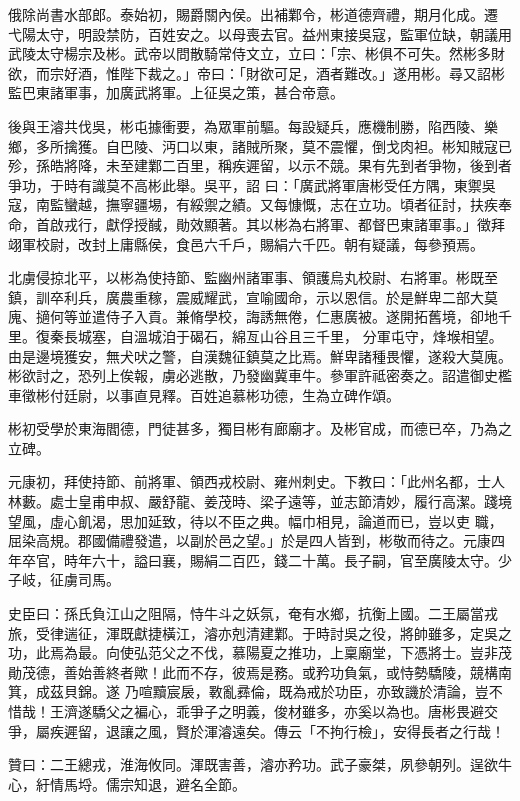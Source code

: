 \begin{pinyinscope}
 俄除尚書水部郎。泰始初，賜爵關內侯。出補鄴令，彬道德齊禮，期月化成。遷
 弋陽太守，明設禁防，百姓安之。以母喪去官。益州東接吳寇，監軍位缺，朝議用武陵太守楊宗及彬。武帝以問散騎常侍文立，立曰：「宗、彬俱不可失。然彬多財欲，而宗好酒，惟陛下裁之。」帝曰：「財欲可足，酒者難改。」遂用彬。尋又詔彬監巴東諸軍事，加廣武將軍。上征吳之策，甚合帝意。



 後與王濬共伐吳，彬屯據衝要，為眾軍前驅。每設疑兵，應機制勝，陷西陵、樂鄉，多所擒獲。自巴陵、沔口以東，諸賊所聚，莫不震懼，倒戈肉袒。彬知賊寇已殄，孫皓將降，未至建鄴二百里，稱疾遲留，以示不競。果有先到者爭物，後到者爭功，于時有識莫不高彬此舉。吳平，詔
 曰：「廣武將軍唐彬受任方隅，東禦吳寇，南監蠻越，撫寧疆埸，有綏禦之績。又每慷慨，志在立功。頃者征討，扶疾奉命，首啟戎行，獻俘授馘，勛效顯著。其以彬為右將軍、都督巴東諸軍事。」徵拜翊軍校尉，改封上庸縣侯，食邑六千戶，賜絹六千匹。朝有疑議，每參預焉。



 北虜侵掠北平，以彬為使持節、監幽州諸軍事、領護烏丸校尉、右將軍。彬既至鎮，訓卒利兵，廣農重稼，震威耀武，宣喻國命，示以恩信。於是鮮卑二部大莫廆、擿何等並遣侍子入貢。兼脩學校，誨誘無倦，仁惠廣被。遂開拓舊境，卻地千里。復秦長城塞，自溫城洎于碣石，綿亙山谷且三千里，
 分軍屯守，烽堠相望。由是邊境獲安，無犬吠之警，自漢魏征鎮莫之比焉。鮮卑諸種畏懼，遂殺大莫廆。彬欲討之，恐列上俟報，虜必逃散，乃發幽冀車牛。參軍許祗密奏之。詔遣御史檻車徵彬付廷尉，以事直見釋。百姓追慕彬功德，生為立碑作頌。



 彬初受學於東海閻德，門徒甚多，獨目彬有廊廟才。及彬官成，而德已卒，乃為之立碑。



 元康初，拜使持節、前將軍、領西戎校尉、雍州刺史。下教曰：「此州名都，士人林藪。處士皇甫申叔、嚴舒龍、姜茂時、梁子遠等，並志節清妙，履行高潔。踐境望風，虛心飢渴，思加延致，待以不臣之典。幅巾相見，論道而已，豈以吏
 職，屈染高規。郡國備禮發遣，以副於邑之望。」於是四人皆到，彬敬而待之。元康四年卒官，時年六十，謚曰襄，賜絹二百匹，錢二十萬。長子嗣，官至廣陵太守。少子岐，征虜司馬。



 史臣曰：孫氏負江山之阻隔，恃牛斗之妖氛，奄有水鄉，抗衡上國。二王屬當戎旅，受律遄征，渾既獻捷橫江，濬亦剋清建鄴。于時討吳之役，將帥雖多，定吳之功，此焉為最。向使弘范父之不伐，慕陽夏之推功，上稟廟堂，下憑將士。豈非茂勛茂德，善始善終者歟！此而不存，彼焉是務。或矜功負氣，或恃勢驕陵，競構南箕，成茲貝錦。遂
 乃喧黷宸扆，斁亂彞倫，既為戒於功臣，亦致譏於清論，豈不惜哉！王濟遂驕父之褊心，乖爭子之明義，俊材雖多，亦奚以為也。唐彬畏避交爭，屬疾遲留，退讓之風，賢於渾濬遠矣。傳云「不拘行檢」，安得長者之行哉！



 贊曰：二王總戎，淮海攸同。渾既害善，濬亦矜功。武子豪桀，夙參朝列。逞欲牛心，紆情馬埒。儒宗知退，避名全節。



\end{pinyinscope}